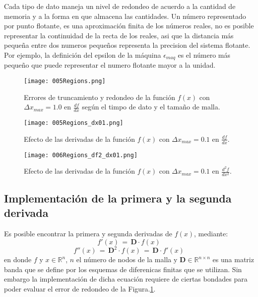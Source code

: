 \documentclass[9pt,technote,twoside,letterpaper,onecolumn]{IEEEtran}
\begin{document}
\begin{multicols}{2}
Cada tipo de dato maneja un nivel de redondeo de acuerdo a la cantidad de memoria y a la forma en que almacena las cantidades. Un número representado por punto flotante, es una aproximación finita de los números reales, no es posible representar la continuidad de la recta de los reales, asi que la distancia más pequeña entre dos numeros pequeños representa la precision del sistema flotante. Por ejemplo, la definición del epsilon de la máquina $\epsilon_{maq}$ es el número más pequeño que puede representar el numero flotante mayor a la unidad.

\begin{figure}[H]
  \centering
  \texttt{[image: 005Regions.png]}
  \caption{Errores de truncamiento y redondeo de la función $f(x)$ con $\Delta x_{max}=1.0$ en $\frac{df}{dx}$ según el timpo de dato y el tamaño de malla.}
  \label{fig:regions_dx10}
\end{figure}

\begin{figure}[H]
  \centering
  \texttt{[image: 005Regions\_dx01.png]}
  \caption{Efecto de las derivadas de la función $f(x)$ con $\Delta x_{max}=0.1$ en $\frac{df}{dx}$.}
  \label{fig:regions_dx01}
\end{figure}

\begin{figure}[H]
  \centering
  \texttt{[image: 006Regions\_df2\_dx01.png]}
  \caption{Efecto de las derivadas de la función $f(x)$ con $\Delta x_{max}=0.1$ en $\frac{d^2f}{dx^2}$.}
  \label{fig:regions_d2fdx01}
\end{figure}

\subsection{Implementación de la primera y la segunda derivada}
\label{sec:imp1rader}
Es posible encontrar la primera y segunda derivadas de $f(x)$, mediante:
\begin{equation}
  f'(x)\,=\,\mathbf{D}\cdot f(x)
  \label{eq:matdiff}  
\end{equation}
\begin{equation}
  f''(x)\,=\,\mathbf{D}^2\cdot f(x)\,=\,\mathbf{D}\cdot f'(x)
  \label{eq:matdiff2}  
\end{equation}
en donde $f$ y $x\in\mathbb{R}^{n}$, $n$ el número de nodos de la malla y $\mathbf{D}\in\mathbb{R}^{n\times n}$ es una matriz banda que se define por los esquemas de diferenicas finitas que se utilizan. Sin embargo la implementación de dicha ecuación requiere de ciertas bondades para poder evaluar el error de redondeo de la Figura.\ref{fig:regions_dx10}.  

\end{multicols}
\end{document}
